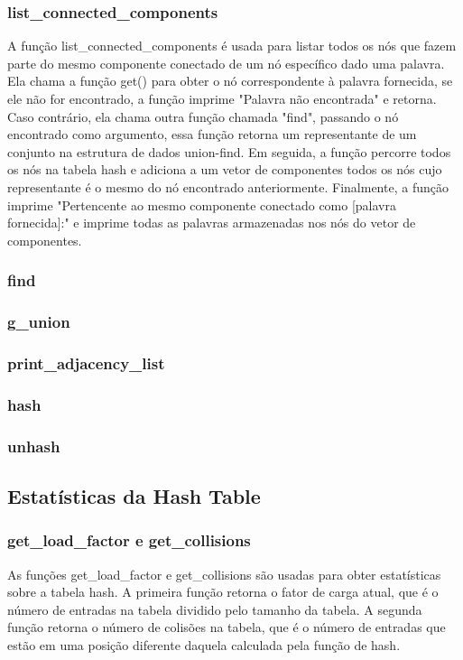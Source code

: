 \documentclass[a4paper,11pt]{article}
\begin{document}
    \subsubsection{list\_connected\_components}
    A função list\_connected\_components é usada para listar todos os nós que fazem parte do mesmo componente conectado de um nó específico dado uma palavra. Ela chama a função get() para obter o nó correspondente à palavra fornecida, se ele não for encontrado, a função imprime "Palavra não encontrada" e retorna. Caso contrário, ela chama outra função chamada "find", passando o nó encontrado como argumento, essa função retorna um representante de um conjunto na estrutura de dados union-find. Em seguida, a função percorre todos os nós na tabela hash e adiciona a um vetor de componentes todos os nós cujo representante é o mesmo do nó encontrado anteriormente. Finalmente, a função imprime "Pertencente ao mesmo componente conectado como [palavra fornecida]:" e imprime todas as palavras armazenadas nos nós do vetor de componentes.
    
    \subsubsection{find}
    
    \subsubsection{g\_union}
    
    \subsubsection{print\_adjacency\_list}
    
    \subsubsection{hash}
    
    \subsubsection{unhash}


    \subsection{Estatísticas da Hash Table}\label{subsec:estatisticas-da-hash-table}

    \subsubsection{get\_load\_factor e get\_collisions}
   As funções get\_load\_factor e get\_collisions são usadas para obter estatísticas sobre a tabela hash. A primeira função retorna o fator de carga atual, que é o número de entradas na tabela dividido pelo tamanho da tabela. A segunda função retorna o número de colisões na tabela, que é o número de entradas que estão em uma posição diferente daquela calculada pela função de hash.
    
\end{document}
